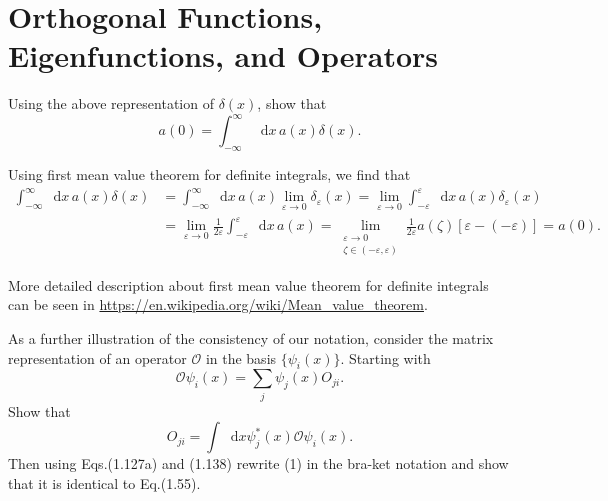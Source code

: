 \documentclass[a4paper]{book}
\newcounter{exercise}[chapter]
\newcounter{solution}[chapter]
\newcommand*{\dif}{\mathop{}\!\mathrm{d}}
\begin{document}
	\section{Orthogonal Functions, Eigenfunctions, and Operators}
	
	\begin{exercise}
	Using the above representation of $\delta(x)$, show that
	\begin{equation*}
		a(0) = \int_{-\infty}^\infty \dif x \, a(x) \delta(x) .
	\end{equation*}
	\end{exercise}
	
	\begin{solution}
	
	Using first mean value theorem for definite integrals, we find that
	\begin{align*}
		\int_{-\infty}^\infty \dif x \, a(x) \delta(x) &= \int_{-\infty}^\infty \dif x \, a(x) \lim_{\varepsilon \rightarrow 0}  \delta_\varepsilon(x) = \lim_{\varepsilon \rightarrow 0} \int_{-\varepsilon}^\varepsilon \dif x \, a(x) \delta_\varepsilon(x) \\
		&= \lim_{\varepsilon \rightarrow 0} \frac{ 1 }{ 2 \varepsilon } \int_{-\varepsilon}^\varepsilon \dif x \, a(x) = \lim_{ \substack{ \varepsilon \rightarrow 0 \\ \zeta \in ( -\varepsilon, \varepsilon )} } \frac{ 1 }{ 2 \varepsilon }a(\zeta) [ \varepsilon - ( - \varepsilon ) ]  = a(0) .
	\end{align*}		
	
	More detailed description about first mean value theorem for definite integrals can be seen in \url{https://en.wikipedia.org/wiki/Mean_value_theorem}.
	
	\end{solution}
	
	\begin{exercise}
	As a further illustration of the consistency of our notation, consider the matrix representation of an operator $\mathscr{O}$ in the basis $\{\psi_i(x)\}$. Starting with
	\begin{equation}
		\mathscr{O} \psi_i(x) = \sum_{j} \psi_j(x) O_{ji} . \tag{1}
	\end{equation}
	Show that
	\begin{equation*}
		O_{ji} = \int \dif x \psi^*_j(x) \mathscr{O} \psi_i(x) .
	\end{equation*}
	Then using Eqs.(1.127a) and (1.138) rewrite (1) in the bra-ket notation and show that it is identical to Eq.(1.55).
	\end{exercise}
	
\end{document}

